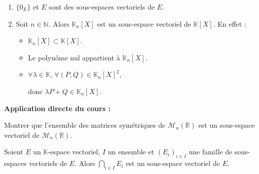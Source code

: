 \documentclass[french,11pt,twoside]{VcCours}
\newenvironment{ApplicationDirecte}{\textbf{Application directe du cours :}

}{}
\begin{document}
\begin{Exemples}
\begin{enumerate}
\item $\lbrace 0_E \rbrace$ et $E$ sont des sous-espaces vectoriels de $E$.
\item Soit $n \in \mathbb{N}$. Alors $\mathbb{K}_n[X]$ est un sous-espace vectoriel de $\mathbb{K}[X]$. En effet :
\begin{itemize}
\item $\mathbb{K}_n[X] \subset \mathbb{K}[X]$.
\item Le polynôme nul appartient à $\mathbb{K}_n[X]$.
\item $\forall \lambda \in \mathbb{K}$, $\forall (P,Q) \in \mathbb{K}_n[X]^2$,

\vspace{1cm}

donc $\lambda P + Q \in \mathbb{K}_n[X]$.
\end{itemize}
\end{enumerate}
\end{Exemples}

\begin{ApplicationDirecte} Montrer que l'ensemble des matrices symétriques de $\mathcal{M}_n(\mathbb{R})$ est un sous-espace vectoriel de $\mathcal{M}_n(\mathbb{R})$. \end{ApplicationDirecte}

\begin{Proposition}{}
Soient $E$ un $\mathbb{K}$-espace vectoriel, $I$ un ensemble et $(E_i)_{i \in I}$ une famille de sous-espaces vectoriels de $E$. Alors $\bigcap_{i \in I} E_i$ est un sous-espace vectoriel de $E$.
\end{Proposition}

\begin{Demonstration}{}
\vspace{5cm}
\end{Demonstration}
\end{document}
